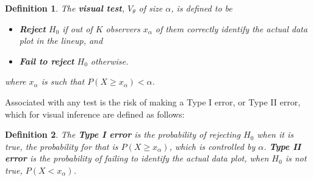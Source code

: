 \documentclass{article}
\newcommand{\blue}[1]{{\color{blue} #1}} %
\newcommand{\red}[1]{{\color{red} #1}}
\newtheorem{dfn}{Definition}[section]
\begin{document}



\begin{dfn}\label{dfn:test}
The \textbf{visual test}, $V_{\theta}$  of size $\alpha$, is defined to be 
\begin{itemize}\itemsep-3pt
\item \textbf{Reject} $H_0$ if out of $K$ observers $x_{\alpha}$ of them correctly identify the actual data plot in the lineup, and
\item \textbf{Fail to reject} $H_0$  otherwise. %
\end{itemize}
where $x_{\alpha}$ is such that $P(X \ge x_{\alpha}) < \alpha$. 
\end{dfn}

Associated with any test is the risk of making a Type I error, or Type II error, which for visual inference are defined as follows: 

\begin{dfn}\label{dfn:error}
The \textbf{Type I error} is the probability of rejecting $H_0$ when it is true, the probability for that is $P(X \ge x_{\alpha})$, which is controlled by $\alpha$.
\textbf{Type II error} is the probability of failing to identify the actual data plot, when $H_0$ is not true, $P( X <  x_{\alpha})$.
\end{dfn}
\end{document}
